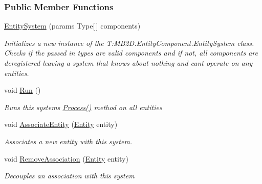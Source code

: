 \subsubsection*{Public Member Functions}
\begin{DoxyCompactItemize}
\item 
\hyperlink{class_m_b2_d_1_1_entity_component_1_1_entity_system_abc7175246313b23db881d09da586428a}{Entity\+System} (params Type\mbox{[}$\,$\mbox{]} components)
\begin{DoxyCompactList}\small\item\em Initializes a new instance of the T\+:\+M\+B2\+D.\+Entity\+Component.\+Entity\+System class. Checks if the passed in types are valid components and if not, all components are deregistered leaving a system that knows about nothing and can\textquotesingle{}t operate on any entities. \end{DoxyCompactList}\item 
void \hyperlink{class_m_b2_d_1_1_entity_component_1_1_entity_system_a3a1a74c4d3f8f0f452e0cdaa5515face}{Run} ()
\begin{DoxyCompactList}\small\item\em Runs this systems \hyperlink{class_m_b2_d_1_1_entity_component_1_1_entity_system_abbf83b87cb5d12754fb058cef50451fa}{Process()} method on all entities \end{DoxyCompactList}\item 
void \hyperlink{class_m_b2_d_1_1_entity_component_1_1_entity_system_aaf18ceb985015ddbff4a361a3b1de5bb}{Associate\+Entity} (\hyperlink{class_m_b2_d_1_1_entity_component_1_1_entity}{Entity} entity)
\begin{DoxyCompactList}\small\item\em Associates a new entity with this system. \end{DoxyCompactList}\item 
void \hyperlink{class_m_b2_d_1_1_entity_component_1_1_entity_system_a6fa9406e1f4a0ca8ddf21cf04be3abe3}{Remove\+Association} (\hyperlink{class_m_b2_d_1_1_entity_component_1_1_entity}{Entity} entity)
\begin{DoxyCompactList}\small\item\em Decouples an association with this system \end{DoxyCompactList}\end{DoxyCompactItemize}
